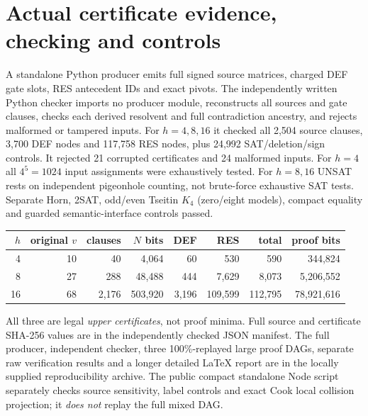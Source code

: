 \documentclass[11pt]{article}
\begin{document}
\section*{Actual certificate evidence, checking and controls}
A standalone Python producer emits full signed source matrices, charged DEF gate slots, RES antecedent IDs and exact pivots. The independently written Python checker imports no producer module, reconstructs all sources and gate clauses, checks each derived resolvent and full contradiction ancestry, and rejects malformed or tampered inputs. For $h=4,8,16$ it checked all 2,504 source clauses, 3,700 DEF nodes and 117,758 RES nodes, plus 24,992 SAT/deletion/sign controls. It rejected 21 corrupted certificates and 24 malformed inputs. For $h=4$ all $4^5=1024$ input assignments were exhaustively tested. For $h=8,16$ UNSAT rests on independent pigeonhole counting, not brute-force exhaustive SAT tests. Separate Horn, 2SAT, odd/even Tseitin $K_4$ (zero/eight models), compact equality and guarded semantic-interface controls passed.
\begin{center}\begin{tabular}{rrrrrrrr}\toprule
$h$&original $v$&clauses&$N$ bits&DEF&RES&total&proof bits\\\midrule
4&10&40&4,064&60&530&590&344,824\\
8&27&288&48,488&444&7,629&8,073&5,206,552\\
16&68&2,176&503,920&3,196&109,599&112,795&78,921,616\\\bottomrule
\end{tabular}\end{center}
All three are legal \emph{upper certificates}, not proof minima. Full source and certificate SHA-256 values are in the independently checked JSON manifest. The full producer, independent checker, three 100\%-replayed large proof DAGs, separate raw verification results and a longer detailed LaTeX report are in the locally supplied reproducibility archive. The public compact standalone Node script separately checks source sensitivity, label controls and exact Cook local collision projection; it \emph{does not} replay the full mixed DAG.
\end{document}

